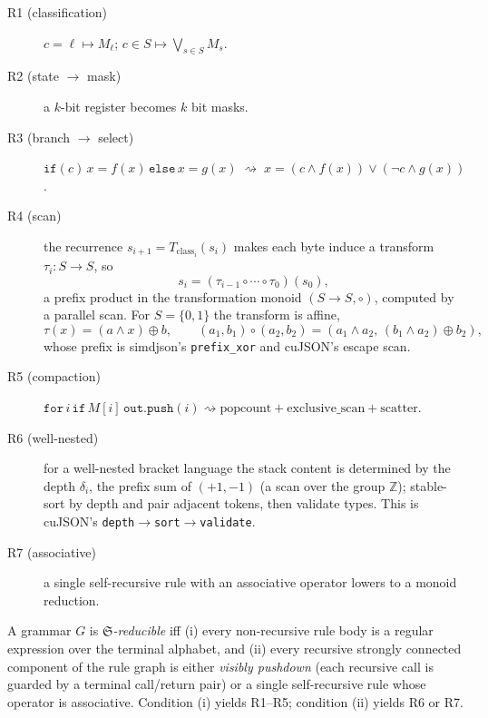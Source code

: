 \documentclass[11pt]{article}
\begin{document}
\begin{description}
\item[R1 (classification)] $c=\ell\mapsto M_\ell$; $c\in S\mapsto\bigvee_{s\in S}M_s$.
\item[R2 (state $\to$ mask)] a $k$-bit register becomes $k$ bit masks.
\item[R3 (branch $\to$ select)]
$\texttt{if}(c)\,x{=}f(x)\,\texttt{else}\,x{=}g(x)\;\rightsquigarrow\;
x=(c\wedge f(x))\vee(\neg c\wedge g(x))$.
\item[R4 (scan)] the recurrence $s_{i+1}=T_{\mathrm{class}_i}(s_i)$ makes each byte
induce a transform $\tau_i:S\to S$, so
\[
s_i=(\tau_{i-1}\circ\cdots\circ\tau_0)(s_0),
\]
a prefix product in the transformation monoid $(S\to S,\circ)$, computed by a
parallel scan.  For $S=\{0,1\}$ the transform is affine,
\[
\tau(x)=(a\wedge x)\oplus b,\qquad
(a_1,b_1)\circ(a_2,b_2)=(a_1\wedge a_2,\,(b_1\wedge a_2)\oplus b_2),
\]
whose prefix is simdjson's \texttt{prefix\_xor} and cuJSON's escape scan.
\item[R5 (compaction)] $\texttt{for}\,i\,\texttt{if}\,M[i]\,\texttt{out.push}(i)
\rightsquigarrow \mathrm{popcount}+\mathrm{exclusive\_scan}+\mathrm{scatter}$.
\item[R6 (well-nested)] for a well-nested bracket language the stack content is
determined by the depth $\delta_i$, the prefix sum of $(+1,-1)$ (a scan over the
group $\mathbb Z$); stable-sort by depth and pair adjacent tokens, then validate
types.  This is cuJSON's \texttt{depth}$\to$\texttt{sort}$\to$\texttt{validate}.
\item[R7 (associative)] a single self-recursive rule with an associative operator
lowers to a monoid reduction.
\end{description}

\begin{definition}
A grammar $G$ is \emph{$\mathfrak{S}$-reducible} iff
(i) every non-recursive rule body is a regular expression over the terminal
alphabet, and
(ii) every recursive strongly connected component of the rule graph is either
\emph{visibly pushdown} (each recursive call is guarded by a terminal
call/return pair) or a single self-recursive rule whose operator is associative.
Condition (i) yields R1--R5; condition (ii) yields R6 or R7.
\end{definition}
\end{document}
